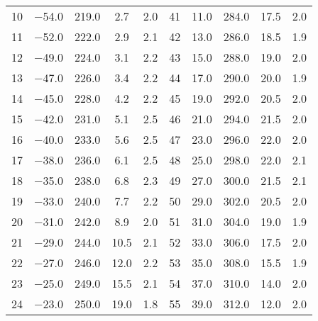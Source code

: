 \begin{table}
\begin{tabular}{S S S S S | S S S S S}
        \num{10} &  \num{-54.0} &  \num{219.0} &  \num{ 2.7} &  \num{2.0} & \num{41} &  \num{ 11.0} &  \num{284.0} &  \num{17.5} &  \num{2.0} \\
        \num{11} &  \num{-52.0} &  \num{222.0} &  \num{ 2.9} &  \num{2.1} & \num{42} &  \num{ 13.0} &  \num{286.0} &  \num{18.5} &  \num{1.9} \\
        \num{12} &  \num{-49.0} &  \num{224.0} &  \num{ 3.1} &  \num{2.2} & \num{43} &  \num{ 15.0} &  \num{288.0} &  \num{19.0} &  \num{2.0} \\
        \num{13} &  \num{-47.0} &  \num{226.0} &  \num{ 3.4} &  \num{2.2} & \num{44} &  \num{ 17.0} &  \num{290.0} &  \num{20.0} &  \num{1.9} \\
        \num{14} &  \num{-45.0} &  \num{228.0} &  \num{ 4.2} &  \num{2.2} & \num{45} &  \num{ 19.0} &  \num{292.0} &  \num{20.5} &  \num{2.0} \\
        \num{15} &  \num{-42.0} &  \num{231.0} &  \num{ 5.1} &  \num{2.5} & \num{46} &  \num{ 21.0} &  \num{294.0} &  \num{21.5} &  \num{2.0} \\
        \num{16} &  \num{-40.0} &  \num{233.0} &  \num{ 5.6} &  \num{2.5} & \num{47} &  \num{ 23.0} &  \num{296.0} &  \num{22.0} &  \num{2.0} \\
        \num{17} &  \num{-38.0} &  \num{236.0} &  \num{ 6.1} &  \num{2.5} & \num{48} &  \num{ 25.0} &  \num{298.0} &  \num{22.0} &  \num{2.1} \\
        \num{18} &  \num{-35.0} &  \num{238.0} &  \num{ 6.8} &  \num{2.3} & \num{49} &  \num{ 27.0} &  \num{300.0} &  \num{21.5} &  \num{2.1} \\
        \num{19} &  \num{-33.0} &  \num{240.0} &  \num{ 7.7} &  \num{2.2} & \num{50} &  \num{ 29.0} &  \num{302.0} &  \num{20.5} &  \num{2.0} \\
        \num{20} &  \num{-31.0} &  \num{242.0} &  \num{ 8.9} &  \num{2.0} & \num{51} &  \num{ 31.0} &  \num{304.0} &  \num{19.0} &  \num{1.9} \\
        \num{21} &  \num{-29.0} &  \num{244.0} &  \num{10.5} &  \num{2.1} & \num{52} &  \num{ 33.0} &  \num{306.0} &  \num{17.5} &  \num{2.0} \\
        \num{22} &  \num{-27.0} &  \num{246.0} &  \num{12.0} &  \num{2.2} & \num{53} &  \num{ 35.0} &  \num{308.0} &  \num{15.5} &  \num{1.9} \\
        \num{23} &  \num{-25.0} &  \num{249.0} &  \num{15.5} &  \num{2.1} & \num{54} &  \num{ 37.0} &  \num{310.0} &  \num{14.0} &  \num{2.0} \\
        \num{24} &  \num{-23.0} &  \num{250.0} &  \num{19.0} &  \num{1.8} & \num{55} &  \num{ 39.0} &  \num{312.0} &  \num{12.0} &  \num{2.0} \\

\end{tabular}
\end{table}
